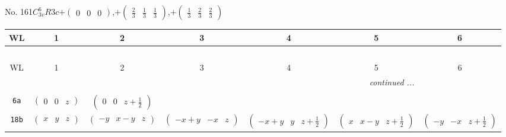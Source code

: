\documentclass[fleqn,9pt,landscape]{jsarticle}
\begin{document}
\newpage
No. 161\quad$C_{3v}^{6}$\quad$R3c$\quad[ trigonal ]\quad$+\begin{pmatrix} 0 & 0 & 0 \end{pmatrix}$,\quad $+\begin{pmatrix} \frac{2}{3} & \frac{1}{3} & \frac{1}{3} \end{pmatrix}$,\quad $+\begin{pmatrix} \frac{1}{3} & \frac{2}{3} & \frac{2}{3} \end{pmatrix}$
\begin{center}
\renewcommand{\arraystretch}{1.2}
\begin{longtable}{ccccccc}
 \hline \hline
WL & 1 & 2 & 3 & 4 & 5 & 6 \\ \hline \endfirsthead

\multicolumn{6}{l}{\tablename\ \thetable{}} \\
 \hline \hline
WL & 1 & 2 & 3 & 4 & 5 & 6 \\ \hline \endhead

 \hline \hline
\multicolumn{6}{r}{\footnotesize\it continued ...} \\ \endfoot

 \hline \hline
\multicolumn{6}{r}{} \\ \endlastfoot

{\tt 6a} & $ \begin{pmatrix} 0 & 0 & z \end{pmatrix} $ & $ \begin{pmatrix} 0 & 0 & z + \frac{1}{2} \end{pmatrix} $ & $  $ & $  $ & $  $ & $  $ \\ \hline
{\tt 18b} & $ \begin{pmatrix} x & y & z \end{pmatrix} $ & $ \begin{pmatrix} - y & x - y & z \end{pmatrix} $ & $ \begin{pmatrix} - x + y & - x & z \end{pmatrix} $ & $ \begin{pmatrix} - x + y & y & z + \frac{1}{2} \end{pmatrix} $ & $ \begin{pmatrix} x & x - y & z + \frac{1}{2} \end{pmatrix} $ & $ \begin{pmatrix} - y & - x & z + \frac{1}{2} \end{pmatrix} $ \\
\end{longtable}
\end{center}
\end{document}
